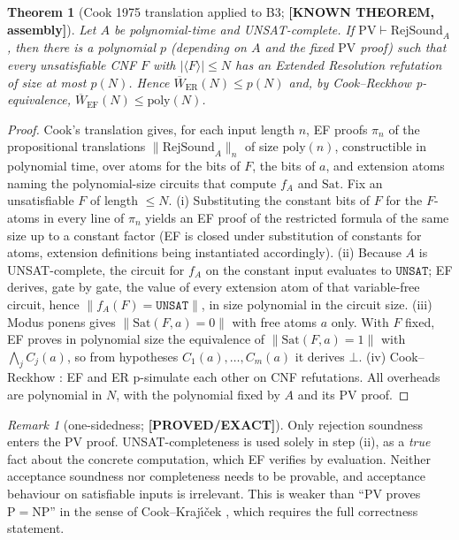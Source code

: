\documentclass[11pt]{article}
\newtheorem{theorem}{Theorem}
\theoremstyle{remark}
\newtheorem*{remark}{Remark}
\newcommand{\EF}{\mathrm{EF}}
\newcommand{\ER}{\mathrm{ER}}
\newcommand{\PV}{\mathrm{PV}}
\newcommand{\Wb}{\overline{W}}
\newcommand{\poly}{\mathrm{poly}}
\newcommand{\RejSound}{\mathrm{RejSound}}
\newcommand{\status}[1]{\textbf{[#1]}}
\begin{document}
\begin{theorem}[Cook 1975 translation applied to B3; \status{KNOWN THEOREM, assembly}]\label{thm:pvef}
Let $A$ be polynomial-time and UNSAT-complete. If $\PV\vdash\RejSound_A$, then there is a polynomial
$p$ (depending on $A$ and the fixed $\PV$ proof) such that every unsatisfiable CNF $F$ with
$|\langle F\rangle|\le N$ has an Extended Resolution refutation of size at most $p(N)$.
Hence $\Wb_{\ER}(N)\le p(N)$ and, by Cook--Reckhow p-equivalence, $\Wb_{\EF}(N)\le\poly(N)$.
\end{theorem}
\begin{proof}
Cook's translation \cite{cook75} gives, for each input length $n$, EF proofs $\pi_n$ of the
propositional translations $\|\RejSound_A\|_n$ of size $\poly(n)$, constructible in polynomial time,
over atoms for the bits of $F$, the bits of $a$, and extension atoms naming the polynomial-size
circuits that compute $f_A$ and $\mathrm{Sat}$. Fix an unsatisfiable $F$ of length $\le N$.
(i) Substituting the constant bits of $F$ for the $F$-atoms in every line of $\pi_n$ yields an EF
proof of the restricted formula of the same size up to a constant factor (EF is closed under
substitution of constants for atoms, extension definitions being instantiated accordingly).
(ii) Because $A$ is UNSAT-complete, the circuit for $f_A$ on the constant input evaluates to
$\mathtt{UNSAT}$; EF derives, gate by gate, the value of every extension atom of that variable-free
circuit, hence $\|f_A(F)=\mathtt{UNSAT}\|$, in size polynomial in the circuit size.
(iii) Modus ponens gives $\|\mathrm{Sat}(F,a)=0\|$ with free atoms $a$ only. With $F$ fixed, EF
proves in polynomial size the equivalence of $\|\mathrm{Sat}(F,a)=1\|$ with $\bigwedge_j C_j(a)$, so
from hypotheses $C_1(a),\dots,C_m(a)$ it derives $\bot$. (iv) Cook--Reckhow \cite{cookreckhow79}:
EF and ER p-simulate each other on CNF refutations. All overheads are polynomial in $N$, with the
polynomial fixed by $A$ and its $\PV$ proof.
\end{proof}

\begin{remark}[one-sidedness; \status{PROVED/EXACT}]
Only rejection soundness enters the $\PV$ proof. UNSAT-completeness is used solely in step (ii), as a
\emph{true} fact about the concrete computation, which EF verifies by evaluation. Neither acceptance
soundness nor completeness needs to be provable, and acceptance behaviour on satisfiable inputs is
irrelevant. This is weaker than ``$\PV$ proves $\mathrm{P}=\mathrm{NP}$'' in the sense of
Cook--Kraj\'{\i}\v{c}ek \cite{ck07}, which requires the full correctness statement.
\end{remark}
\end{document}
